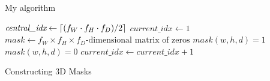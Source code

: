 \begin{subappendices}
\setcounter{algorithm}{-1}
\begin{algorithm}
\caption{My algorithm}\label{imgc:euclid}
\begin{algorithmic}[1]
    \State $\textit{central\_idx} \gets \lceil(f_W \cdot f_H \cdot f_D) / 2\rceil$
    \State $\textit{current\_idx} \gets 1$
    \State $\textit{mask} \gets f_W \times f_H \times f_D \text{-dimensional matrix of zeros}$
                 \label{imgc:alg:maskmaker:lineLT}
                    \State $mask(w, h, d) = 1$
                \Else
                    \State $mask(w, h, d) = 0$
                \EndIf
                \State $\textit{current\_idx} \gets \textit{current\_idx} + 1$
            \EndFor
        \EndFor
    \EndFor
\end{algorithmic}
\caption{Constructing 3D Masks}
\label{imgc:alg:maskmaker}
\end{algorithm}


\end{subappendices} 

